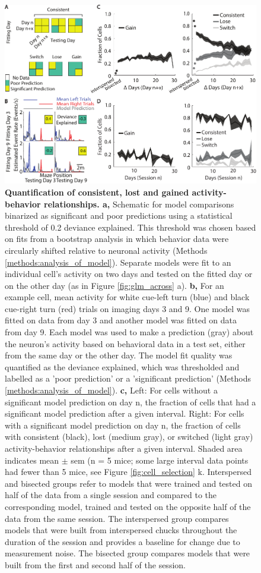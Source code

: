 \begin{figure}
\includegraphics[width=\textwidth]{figures/4_glm_across_population.pdf}
\caption[Quantification of consistent, lost and gained activity-behavior relationships.]{\textbf{Quantification of consistent, lost and gained activity-behavior relationships. a,} Schematic for model comparisons binarized as significant and poor predictions using a statistical threshold of 0.2 deviance explained. This threshold was chosen based on fits from a bootstrap analysis in which behavior data were circularly shifted relative to neuronal activity (Methods \ref{methods:analysis_of_model}). Separate models were fit to an individual cell's activity on two days and tested on the fitted day or on the other day (as in Figure \ref{fig:glm_across} a). 
%
\textbf{b,} For an example cell, mean activity for white cue-left turn (blue) and black cue-right turn (red) trials on imaging days 3 and 9. One model was fitted on data from day 3 and another model was fitted on data from day 9. Each model was used to make a prediction (gray) about the neuron's activity based on behavioral data in a test set, either from the same day or the other day. The model fit quality was quantified as the deviance explained, which was thresholded and labelled as a 'poor prediction' or a 'significant prediction' (Methods \ref{methods:analysis_of_model}).
%
\textbf{c,} Left: For cells without a significant model prediction on day n, the fraction of cells that had a significant model prediction after a given interval. Right: For cells with a significant model prediction on day n, the fraction of cells with consistent (black), lost (medium gray), or switched (light gray) activity-behavior relationships after a given interval. Shaded area indicates mean $\pm$ sem (n = 5 mice; some large interval data points had fewer than 5 mice, see Figure \ref{fig:cell_selection} k. Interspersed and bisected groups refer to models that were trained and tested on half of the data from a single session and compared to the corresponding model, trained and tested on the opposite half of the data from the same session. The interspersed group compares models that were built from interspersed chucks throughout the duration of the session and provides a baseline for change due to measurement noise. The bisected group compares models that were built from the first and second half of the session.
}
\end{figure}
